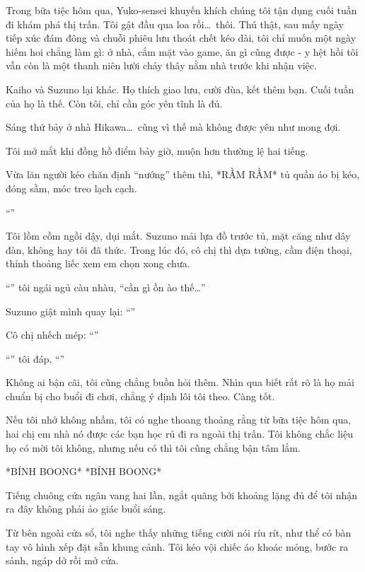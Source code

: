 \documentclass[../main.tex]{subfiles}
\begin{document}
Trong bữa tiệc hôm qua, Yuko-sensei khuyến khích chúng tôi tận dụng cuối tuần đi khám phá thị trấn. Tôi gật đầu qua loa rồi\dots\ thôi. Thú thật, sau mấy ngày tiếp xúc đám đông và chuỗi phiêu lưu thoát chết kéo dài, tôi chỉ muốn một ngày hiếm hoi chẳng làm gì: ở nhà, cắm mặt vào game, ăn gì cũng được - y hệt hồi tôi vẫn còn là một thanh niên lười chảy thây nằm nhà trước khi nhận việc.

Kaiho và Suzuno lại khác. Họ thích giao lưu, cười đùa, kết thêm bạn. Cuối tuần của họ là thế. Còn tôi, chỉ cần góc yên tĩnh là đủ.

Sáng thứ bảy ở nhà Hikawa\dots\ cũng vì thế mà không được yên như mong đợi.

Tôi mở mắt khi đồng hồ điểm bảy giờ, muộn hơn thường lệ hai tiếng.

Vừa lăn người kéo chăn định ``nướng'' thêm thì, *RẦM RẦM* tủ quần áo bị kéo, đóng sầm, móc treo lạch cạch.

``''

Tôi lồm cồm ngồi dậy, dụi mắt. Suzuno mải lựa đồ trước tủ, mặt căng như dây đàn, không hay tôi đã thức. Trong lúc đó, cô chị thì dựa tường, cầm điện thoại, thỉnh thoảng liếc xem em chọn xong chưa.

``'' tôi ngái ngủ càu nhàu, ``{cần gì ồn ào thế\dots}''

Suzuno giật mình quay lại: ``''

Cô chị nhếch mép: ``''

``'' tôi đáp, ``''

Không ai bận cãi, tôi cũng chẳng buồn hỏi thêm. Nhìn qua biết rất rõ là họ mải chuẩn bị cho buổi đi chơi, chẳng ý định lôi tôi theo. Càng tốt.

Nếu tôi nhớ không nhầm, tôi có nghe thoang thoảng rằng từ bữa tiệc hôm qua, hai chị em nhà nó được các bạn học rủ đi ra ngoài thị trấn. Tôi không chắc liệu họ có mời tôi không, nhưng nếu có thì tôi cũng chẳng bận tâm lắm.

*BÍNH BOONG* *BÍNH BOONG*

Tiếng chuông cửa ngân vang hai lần, ngắt quãng bởi khoảng lặng đủ để tôi nhận ra đây không phải ảo giác buổi sáng.

Từ bên ngoài cửa sổ, tôi nghe thấy những tiếng cười nói ríu rít, như thể có bàn tay vô hình xếp đặt sẵn khung cảnh. Tôi kéo vội chiếc áo khoác mỏng, bước ra sảnh, ngáp dở rồi mở cửa.
\end{document}
